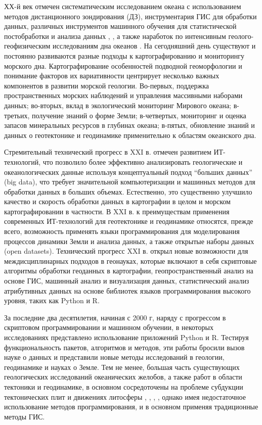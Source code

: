 ХХ-й век отмечен систематическим исследованием океана с использованием методов дистанционного зондирования (ДЗ), инструментария ГИС для обработки данных, различных инструментов машинного обучения для статистической постобработки и анализа данных \cite{Агеев}, \cite{Лаверов}, а также наработок по интенсивным геолого-геофизическим исследованиям дна океанов \cite{Зенкевич1961}. На сегодняшний день существуют и постоянно развиваются разные подходы к картографированию и мониторингу морского дна. Картографирование особенностей подводной геоморфологии и понимание факторов их вариативности центрирует несколько важных компонентов в развитии морской геологии. Во-первых, поддержка пространственных морских наблюдений и управления массивными наборами данных; во-вторых, вклад в экологический мониторинг Мирового океана; в-третьих, получение знаний о форме Земли; в-четвертых, мониторинг и оценка запасов минеральных ресурсов в глубинах океана; в-пятых, обновление знаний и данных о геотектонике и геодинамике применительно к областям океанского дна.

Стремительный технический прогресс в XXI в. отмечен развитием ИТ-технологий, что позволило более эффективно анализировать геологические и океанологических данные используя концептуальный подход “больших данных” (big data), что требует значительной компьютеризации и машинных методов для обработки данных в больших объемах. Естественно, это существенно улучшило качество и скорость обработки данных в картографии в целом и морском картографировании в частности. В XXI в. к преимуществам применения современных ИТ-технологий для геотектонике и геодинамике относятся, прежде всего, возможность применять языки программирования для моделирования процессов динамики Земли и анализа данных, а также открытые наборы данных (open datasets). Технический прогресс XXI в. открыл новые возможности для междисциплинарных подходов в геонауках, которые включают в себя скриптовые алгоритмы обработки геоданных в картографии, геопространственный анализ на основе ГИС, машинный анализ и визуализация данных, статистический анализ атрибутивных данных на основе библиотек языков программирования высокого уровня, таких как Python и R. 

За последние два десятилетия, начиная с 2000 г, наряду с прогрессом в скриптовом программировании и машинном обучении, в некоторых исследованиях представлено использование приложений Python и R. Тестируя функциональность пакетов, алгоритмов и методов, эти работы бросили вызов науке о данных и представили новые методы исследований в геологии, геодинамике и науках о Земле. Тем не менее, большая часть существующих геологических исследований океанических желобов, а также работ в области тектоники и геодинамике, в основном сосредоточены на проблеме субдукции тектонических плит и движениях литосферы \cite{Артюшков}, \cite{БезруковУдинцев}, \cite{Мазарович2005}, \cite{Пущаровский}, однако имея недостаточное использование методов программирования, и в основном применяя традиционные методы ГИС. 

